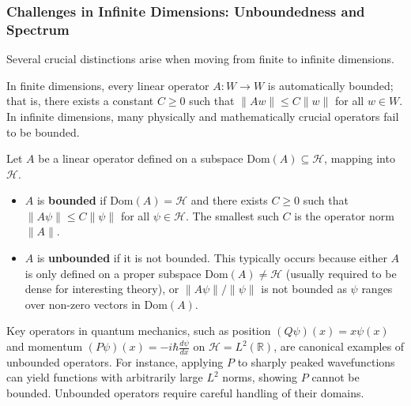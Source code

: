 \subsubsection{Challenges in Infinite Dimensions: Unboundedness and Spectrum}
\label{subsec:infinite_challenges}

Several crucial distinctions arise when moving from finite to infinite dimensions.

In finite dimensions, every linear operator $A: W \to W$ is automatically bounded; that is, there exists a constant $C \ge 0$ such that $\|Aw\| \le C \|w\|$ for all $w \in W$. In infinite dimensions, many physically and mathematically crucial operators fail to be bounded.

\begin{definition}
Let $A$ be a linear operator defined on a subspace $\text{Dom}(A) \subseteq \mathcal{H}$, mapping into $\mathcal{H}$.
\begin{itemize}
    \item $A$ is \textbf{bounded} if $\text{Dom}(A) = \mathcal{H}$ and there exists $C \ge 0$ such that $\|A\psi\| \le C \|\psi\|$ for all $\psi \in \mathcal{H}$. The smallest such $C$ is the operator norm $\|A\|$.
    \item $A$ is \textbf{unbounded} if it is not bounded. This typically occurs because either $A$ is only defined on a proper subspace $\text{Dom}(A) \neq \mathcal{H}$ (usually required to be dense for interesting theory), or $\|A\psi\|/\|\psi\|$ is not bounded as $\psi$ ranges over non-zero vectors in $\text{Dom}(A)$.
\end{itemize}
\end{definition}

Key operators in quantum mechanics, such as position $(Q\psi)(x) = x\psi(x)$ and momentum $(P\psi)(x) = -i\hbar \frac{d\psi}{dx}$ on $\mathcal{H} = L^2(\mathbb{R})$, are canonical examples of unbounded operators. For instance, applying $P$ to sharply peaked wavefunctions can yield functions with arbitrarily large $L^2$ norms, showing $P$ cannot be bounded. Unbounded operators require careful handling of their domains.

